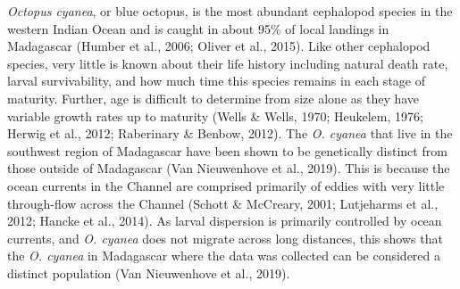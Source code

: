\documentclass[
]{article}
\begin{document}
\emph{Octopus cyanea}, or blue octopus, is the most abundant cephalopod species in the western Indian Ocean and is caught in about 95\% of local landings in Madagascar (Humber et al., 2006; Oliver et al., 2015). Like other cephalopod species, very little is known about their life history including natural death rate, larval survivability, and how much time this species remains in each stage of maturity. Further, age is difficult to determine from size alone as they have variable growth rates up to maturity (Wells \& Wells, 1970; Heukelem, 1976; Herwig et al., 2012; Raberinary \& Benbow, 2012). The \emph{O. cyanea} that live in the southwest region of Madagascar have been shown to be genetically distinct from those outside of Madagascar (Van Nieuwenhove et al., 2019). This is because the ocean currents in the Channel are comprised primarily of eddies with very little through-flow across the Channel (Schott \& McCreary, 2001; Lutjeharms et al., 2012; Hancke et al., 2014). As larval dispersion is primarily controlled by ocean currents, and \emph{O. cyanea} does not migrate across long distances, this shows that the \emph{O. cyanea} in Madagascar where the data was collected can be considered a distinct population (Van Nieuwenhove et al., 2019).
\end{document}
